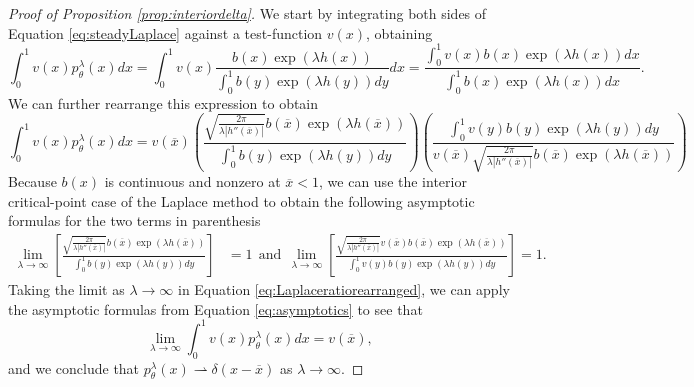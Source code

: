 \documentclass[11pt]{article}
\numberwithin{equation}{section}
\newcommand{\ds}{\displaystyle}
\newcommand{\ol}{\overline}
\begin{document}
{\begin{proof}[Proof of Proposition \ref{prop:interiordelta}]
 We start by integrating both sides of Equation \ref{eq:steadyLaplace} against a test-function $v(x)$, obtaining 
\begin{equation*} 
\int_0^1 v(x) p^{\lambda}_{\theta}(x) dx = \int_0^1 v(x)  \frac{b(x) \exp\left( \lambda h(x)\right) }{ \int_0^1 b(y) \exp\left( \lambda h(y) \right) dy } dx = \frac{\int_0^1 v(x) b(x) \exp\left( \lambda h(x) \right) dx}{ \int_0^1 b(x) \exp\left(\lambda h(x) \right) dx }.
\end{equation*}
We can further rearrange this expression to obtain 
\begin{dmath} \label{eq:Laplaceratiorearranged}
\int_0^1 v(x) p^{\lambda}_{\theta}(x) dx  
= v(\overline{x}) \left( \frac{\sqrt{\frac{2 \pi}{\lambda |h''(\overline{x})| }}b(\overline{x}) \exp\left( \lambda h(\overline{x})\right)}{\int_0^1 b(y) \exp\left(\lambda h(y) \right) dy} \right) \left( \frac{\int_0^1 v(y) b(y) \exp\left( \lambda h(y) \right) dy}{v(\overline{x}) \sqrt{\frac{2 \pi}{\lambda |h''(\overline{x})| }}b(\overline{x}) \exp\left( \lambda h(\overline{x})\right)}\right)
\end{dmath}
%
Because $b(x)$ is continuous and nonzero at $\overline{x} < 1$, we can use the interior critical-point case of the Laplace method \cite{bender1999advanced} to obtain the following asymptotic formulas  for the two terms in parenthesis 
\begin{align}
    \ds\lim_{\lambda \to \infty} \left[ \frac{\sqrt{\frac{2 \pi}{\lambda |h''(\overline{x})| }}b(\overline{x}) \exp\left( \lambda h(\overline{x})\right)}{\int_0^1 b(y) \exp\left(\lambda h(y) \right) dy} \right] &= 1 \: \: \mathrm{and} \: \:
    \ds\lim_{\lambda \to \infty}  \left[  \frac{ \sqrt{\frac{2 \pi}{\lambda |h''(\overline{x})| }}v(\overline{x}) b(\overline{x}) \exp\left( \lambda h(\overline{x})\right)}{\int_0^1 v(y) b(y) \exp\left(\lambda h(y) \right) dy} \right] = 1. \label{eq:asymptotics}
\end{align}
Taking the limit as $\lambda \to \infty$ in Equation \eqref{eq:Laplaceratiorearranged}, we can apply the asymptotic formulas from Equation \eqref{eq:asymptotics} to see that
\begin{equation*}
\ds\lim_{\lambda \to \infty} \int_0^1 v(x) p^{\lambda}_{\theta}(x) dx = v(\overline{x}),
\end{equation*}
and we conclude that $p_{\theta}^{\lambda}(x) \rightharpoonup \delta(x - \ol{x})$ as $\lambda \to \infty$. 
\end{proof}





}
\end{document}
